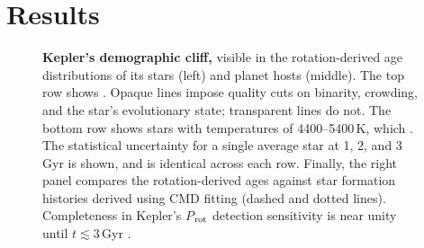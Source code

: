 \documentclass[11pt,twocolumn,tighten]{aastex63}
\begin{document}
\section{Results}
\label{sec:results}

\begin{figure}[!t]
  \begin{center}
    \leavevmode

	\vspace{-0.35cm}
%
  \end{center}
  \vspace{-0.6cm}
  \caption{{\bf Kepler's demographic cliff,} visible in the
  rotation-derived age distributions of its stars (left) and planet
  hosts (middle).  The top row shows .  Opaque lines
  impose quality cuts on binarity, crowding, and the star's
  evolutionary state; transparent lines do not.  The bottom row shows
  stars with temperatures of 4400--5400\,K, which .  The statistical uncertainty for a
  single average star at 1, 2, and 3\,Gyr is shown, and is identical across each
  row.  
  Finally, the right panel compares the rotation-derived ages
  against star formation histories derived using CMD fitting (dashed
  and dotted lines).  Completeness in Kepler's $P$$_{\rm rot}$
  detection sensitivity is near unity until $t$$\lesssim$3\,Gyr
  \citep{2022ApJ...937...94M}.
  \label{fig:hist_tgyro}
  }
\end{figure}
\end{document}
